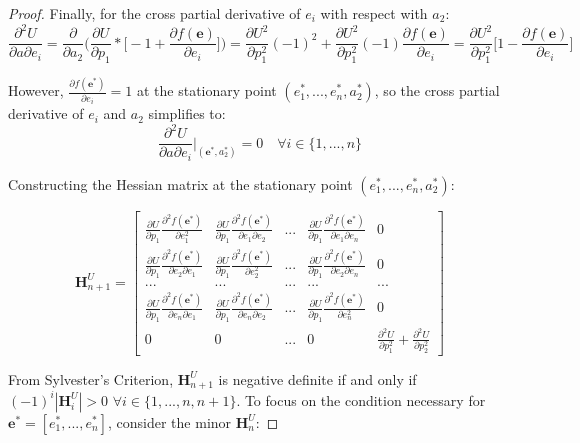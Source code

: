 \documentclass[11pt]{article}
\theoremstyle{definition}
\theoremstyle{remark}
\begin{document}
\begin{proof}
Finally, for the cross partial derivative of $e_i$ with respect with $a_2$: $$\frac{\partial^2 U}{\partial a\partial e_i}=\frac{\partial}{\partial a_2}\bigg(\frac{\partial U}{\partial p_1}*\bigg[-1+\frac{\partial f(\mathbf{e})}{\partial e_i}\bigg]\bigg)=\frac{\partial U^2}{\partial p_1^2}(-1)^2+\frac{\partial U^2}{\partial p_1^2}(-1)\frac{\partial f(\mathbf{e})}{\partial e_i}=\frac{\partial U^2}{\partial p_1^2}\bigg[1-\frac{\partial f(\mathbf{e})}{\partial e_i}\bigg]$$

However, $\frac{\partial f(\mathbf{e^*})}{\partial e_i}=1$ at the stationary point $(e_1^*,...,e^*_n,a_2^*)$, so the cross partial derivative of $e_i$ and $a_2$ simplifies to:
$$\frac{\partial^2 U}{\partial a\partial e_i}\bigg|_{(\mathbf{e}^*,a^*_2)}=0\quad\forall i\in\{1,...,n\}$$

Constructing the Hessian matrix at the stationary point $(e^*_1,...,e^*_n,a^*_2)$:

$$\mathbf{H}^U_{n+1}=\begin{bmatrix}
\frac{\partial U}{\partial p_1}\frac{\partial^2 f(\mathbf{e}^*)}{\partial e_1^2} & \frac{\partial U}{\partial p_1}\frac{\partial^2 f(\mathbf{e}^*)}{\partial e_1\partial e_2} & ... & \frac{\partial U}{\partial p_1}\frac{\partial^2 f(\mathbf{e}^*)}{\partial e_1\partial e_n} & 0\\
\frac{\partial U}{\partial p_1}\frac{\partial^2 f(\mathbf{e}^*)}{\partial e_2\partial e_1} & \frac{\partial U}{\partial p_1}\frac{\partial^2 f(\mathbf{e}^*)}{\partial e_2^2} & ... & \frac{\partial U}{\partial p_1}\frac{\partial^2 f(\mathbf{e}^*)}{\partial e_2\partial e_n} & 0\\
... & ... & ... & ... & ...\\
\frac{\partial U}{\partial p_1}\frac{\partial^2 f(\mathbf{e}^*)}{\partial e_n\partial e_1} & \frac{\partial U}{\partial p_1}\frac{\partial^2 f(\mathbf{e}^*)}{\partial e_n\partial e_2} & ... & \frac{\partial U}{\partial p_1}\frac{\partial^2 f(\mathbf{e}^*)}{\partial e_n^2} & 0\\
0 & 0 & ... & 0 & \frac{\partial^2 U}{\partial p_1^2}+\frac{\partial^2 U}{\partial p_2^2}
\end{bmatrix}$$

From Sylvester's Criterion, $\mathbf{H}^U_{n+1}$ is negative definite if and only if $(-1)^i|\mathbf{H}^U_i|>0$ $\forall i\in\{1,...,n,n+1\}$. To focus on the condition necessary for $\mathbf{e}^*=[e^*_1,...,e^*_n]$, consider the minor $\mathbf{H}^U_n$:


\end{proof}
\end{document}
